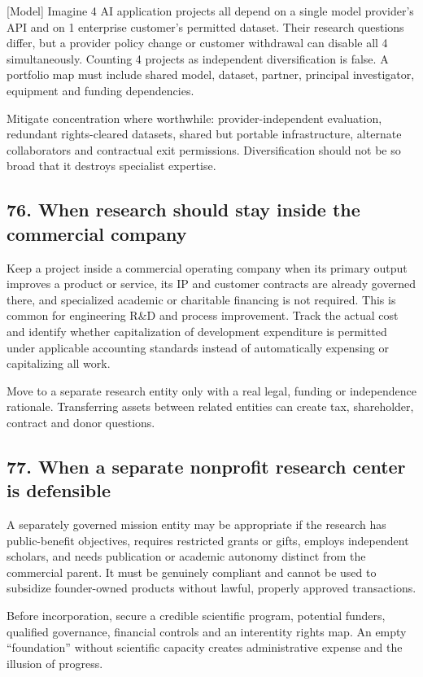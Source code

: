 [Model] Imagine 4 AI application projects all depend on a single model provider's API and on 1 enterprise customer's permitted dataset. Their research questions differ, but a provider policy change or customer withdrawal can disable all 4 simultaneously. Counting 4 projects as independent diversification is false. A portfolio map must include shared model, dataset, partner, principal investigator, equipment and funding dependencies.

Mitigate concentration where worthwhile: provider-independent evaluation, redundant rights-cleared datasets, shared but portable infrastructure, alternate collaborators and contractual exit permissions. Diversification should not be so broad that it destroys specialist expertise.

\subsection{76. When research should stay inside the commercial company}

Keep a project inside a commercial operating company when its primary output improves a product or service, its IP and customer contracts are already governed there, and specialized academic or charitable financing is not required. This is common for engineering R\&D and process improvement. Track the actual cost and identify whether capitalization of development expenditure is permitted under applicable accounting standards instead of automatically expensing or capitalizing all work.

Move to a separate research entity only with a real legal, funding or independence rationale. Transferring assets between related entities can create tax, shareholder, contract and donor questions.

\subsection{77. When a separate nonprofit research center is defensible}

A separately governed mission entity may be appropriate if the research has public-benefit objectives, requires restricted grants or gifts, employs independent scholars, and needs publication or academic autonomy distinct from the commercial parent. It must be genuinely compliant and cannot be used to subsidize founder-owned products without lawful, properly approved transactions.

Before incorporation, secure a credible scientific program, potential funders, qualified governance, financial controls and an interentity rights map. An empty ``foundation'' without scientific capacity creates administrative expense and the illusion of progress.

